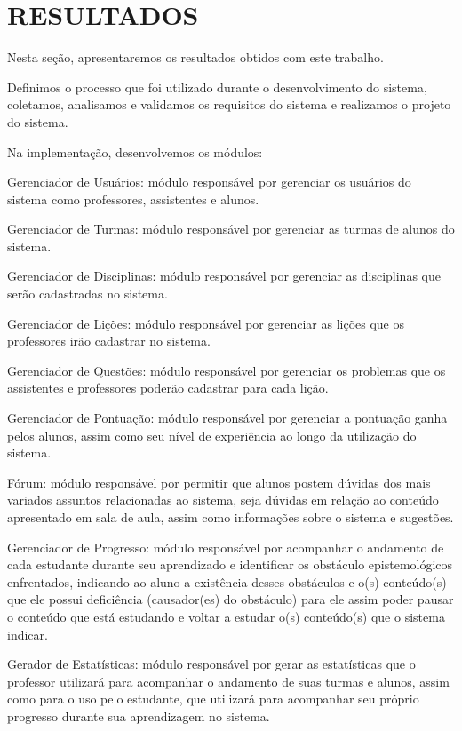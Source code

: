 \chapter{RESULTADOS}
\label{chap:resultados}

Nesta seção, apresentaremos os resultados obtidos com este trabalho.

Definimos o processo que foi utilizado durante o desenvolvimento do sistema, coletamos, analisamos e validamos os requisitos do sistema e realizamos o projeto do sistema. 

Na implementação, desenvolvemos os módulos: 

\begin{alineascomponto}
    \item Gerenciador de Usuários: módulo responsável por gerenciar os usuários do sistema como professores, assistentes e alunos.
    \item Gerenciador de Turmas: módulo responsável por gerenciar as turmas de alunos do sistema.
    \item Gerenciador de Disciplinas: módulo responsável por gerenciar as disciplinas que serão cadastradas no sistema.
    \item Gerenciador de Lições: módulo responsável por gerenciar as lições que os professores irão cadastrar no sistema.
    \item Gerenciador de Questões: módulo responsável por gerenciar os problemas que os assistentes e professores poderão cadastrar para cada lição.
    \item Gerenciador de Pontuação: módulo responsável por gerenciar a pontuação ganha pelos alunos, assim como seu nível de experiência ao longo da utilização do sistema. 
    \item Fórum: módulo responsável por permitir que alunos postem dúvidas dos mais variados  assuntos relacionadas ao sistema, seja dúvidas em relação ao conteúdo apresentado em sala de aula, assim como informações sobre o sistema e sugestões.
    \item Gerenciador de Progresso: módulo responsável por acompanhar o andamento de cada estudante durante seu aprendizado e identificar os obstáculo epistemológicos enfrentados, indicando ao aluno a exist\^encia desses obst\'aculos e o(s) conte\'udo(s) que ele possui defici\^encia (causador(es) do obstáculo) para ele assim poder pausar o conte\'udo que est\'a estudando e voltar a estudar o(s) conte\'udo(s) que o sistema indicar.
	\item Gerador de Estatísticas: módulo responsável por gerar as estatísticas que o professor utilizará para acompanhar o andamento de suas turmas e alunos, assim como para o uso pelo estudante, 
que utilizará para acompanhar seu próprio progresso durante sua aprendizagem no sistema. 
\end{alineascomponto}

